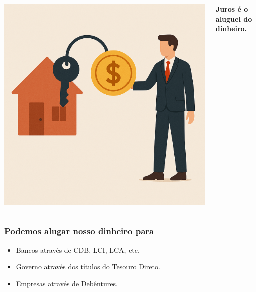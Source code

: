 \begin{frame}[c]
    \frametitle{}
    \begin{columns}
        \begin{column}{0.5\textwidth}
            \includegraphics[width=\textwidth]{../figuras/aluguel2.png}
        \end{column}
        \begin{column}{0.5\textwidth}
            \centering
            \textbf{\Large Juros é o aluguel do dinheiro.}
        \end{column}
    \end{columns}
\end{frame}

\begin{frame}[c]\frametitle{Podemos alugar nosso dinheiro para}
    \begin{itemize}
        \item Bancos através de CDB, LCI, LCA, etc.
        \item Governo através dos títulos do Tesouro Direto.
        \item Empresas através de Debêntures.
    \end{itemize}
\end{frame}
